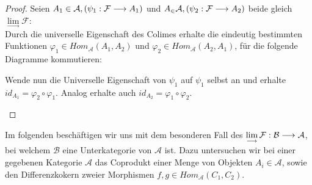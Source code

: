 \documentclass[10pt,a4paper]{report}
\newcommand{\comment}[1]{}
\newcommand{\functionfront}[3]{\nolinebreak{#1:#2 \longrightarrow #3}}
\newcommand{\colimes}[0]{\lim\limits_{ \longrightarrow }}
\begin{document}
\begin{proof}
Seien $A_1 \in \mathcal{A}, (\functionfront{\psi_1}{\mathcal{F}}{A_1}) $ und $A_ \in \mathcal{A} , (\functionfront{\psi_2}{\mathcal{F}}{A_2}) $ beide gleich $\colimes \mathcal{F}$:\\
Durch die universelle Eigenschaft des Colimes erhalte die eindeutig bestimmten Funktionen $\varphi_1 \in Hom_{\mathcal{A}}(A_1,A_2)$ und $\varphi_2 \in Hom_{\mathcal{A}}(A_2,A_1)$, für die folgende Diagramme kommutieren:

\comment{$\functionfront{\varphi_1}{\mathcal{A}_1}{\mathcal{A}_2}$ und $\functionfront{\varphi_2}{\mathcal{A}_2}{\mathcal{A}_1}$}
\begin{center}
\end{center}
\begin{flushleft}
Wende nun die Universelle Eigenschaft von $\psi_1$ auf $\psi_1$ selbst an und erhalte $id_{A_1} = \varphi_2 \circ \varphi_1$. Analog erhalte auch $id_{A_2} = \varphi_1 \circ \varphi_2$.
\end{flushleft}
\begin{center}
\end{center}
\end{proof}

Im folgenden beschäftigen wir uns mit dem besonderen Fall des $\colimes \functionfront{\mathcal{F}}{\mathcal{B}}{\mathcal{A}}$, bei welchem $\mathcal{B}$ eine Unterkategorie von $\mathcal{A}$ ist. Dazu untersuchen wir bei einer gegebenen Kategorie $\mathcal{A}$ das Coprodukt einer Menge von Objekten $A_i \in \mathcal{A}$, sowie den Differenzkokern zweier Morphismen $f,g \in Hom_{\mathcal{A}}(C_1,C_2)$.
\end{document}
